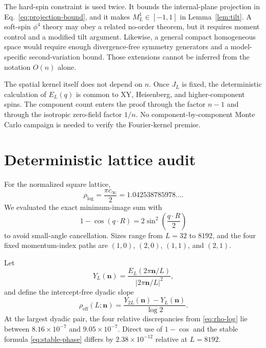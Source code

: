 \documentclass[aps,prb,twocolumn,groupedaddress,amsmath,amssymb,
               superscriptaddress,nofootinbib,floatfix]{revtex4-2}
\theoremstyle{plain}
\theoremstyle{definition}
\newcommand{\cinf}{c_\infty}
\newcommand{\rhoLog}{\rho_{\log}}
\begin{document}
The hard-spin constraint is used twice.  It bounds the internal-plane
projection in Eq.~\eqref{eq:projection-bound}, and it makes
$M_L^1\in[-1,1]$ in Lemma~\ref{lem:tilt}.  A soft-spin $\phi^4$ theory may
obey a related no-order theorem, but it requires moment control and a
modified tilt argument.  Likewise, a general compact homogeneous space
would require enough divergence-free symmetry generators and a
model-specific second-variation bound.  Those extensions cannot be inferred
from the notation $O(n)$ alone.

The spatial kernel itself does not depend on $n$.  Once $J_L$ is fixed,
the deterministic calculation of $E_L(q)$ is common to XY, Heisenberg, and
higher-component spins.  The component count enters the proof through the
factor $n-1$ and through the isotropic zero-field factor $1/n$.  No
component-by-component Monte Carlo campaign is needed to verify the
Fourier-kernel premise.

\section{Deterministic lattice audit}
\label{sec:kernel-audit}

For the normalized square lattice,
\begin{equation}
 \rhoLog=\frac{\pi\cinf}{2}
 =1.042538785978\ldots.                                \label{eq:rho-log}
\end{equation}
We evaluated the exact minimum-image sum with
\begin{equation}
 1-\cos(q\cdot R)=2\sin^2\!\left(\frac{q\cdot R}{2}\right)             \label{eq:stable-phase}
\end{equation}
to avoid small-angle cancellation.  Sizes range from $L=32$ to $8192$,
and the four fixed momentum-index paths are
$(1,0)$, $(2,0)$, $(1,1)$, and $(2,1)$.

Let
\begin{equation}
 Y_L(\bm n)=
 \frac{E_L(2\pi\bm n/L)}{|2\pi\bm n/L|^2},
\end{equation}
and define the intercept-free dyadic slope
\begin{equation}
 \rho_{\mathrm{eff}}(L;\bm n)
 =
 \frac{Y_{2L}(\bm n)-Y_L(\bm n)}{\log2}.                \label{eq:rho-effective}
\end{equation}
At the largest dyadic pair, the four relative discrepancies from
\eqref{eq:rho-log} lie between $8.16\times10^{-7}$ and
$9.05\times10^{-7}$.  Direct use of $1-\cos$ and the stable
formula \eqref{eq:stable-phase} differs by $2.38\times10^{-12}$ relative at
$L=8192$.
\end{document}

